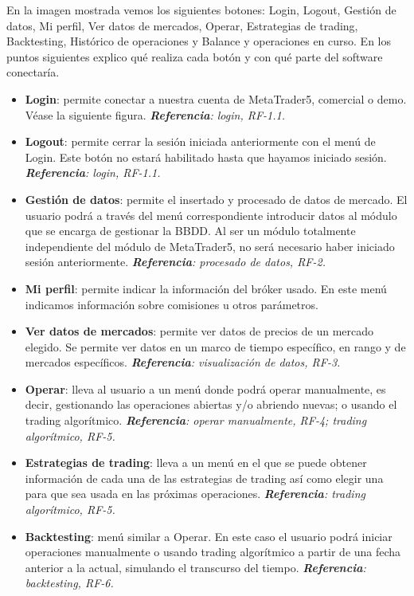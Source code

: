 \begin{titlepage}
En la imagen mostrada vemos los siguientes botones: Login, Logout, Gestión de datos, Mi perfil, Ver datos de mercados, Operar, Estrategias de trading, Backtesting, Histórico de operaciones y Balance y operaciones en curso. En los puntos siguientes explico qué realiza cada botón y con qué parte del software conectaría.\newline

\begin{itemize}
	\item \textbf{Login}: permite conectar a nuestra cuenta de MetaTrader5, comercial o demo. Véase la siguiente figura. \textit{\textbf{Referencia}: login, RF-1.1.}
	\item \textbf{Logout}: permite cerrar la sesión iniciada anteriormente con el menú de Login. Este botón no estará habilitado hasta que hayamos iniciado sesión. \textit{\textbf{Referencia}: login, RF-1.1.}
	\item \textbf{Gestión de datos}: permite el insertado y procesado de datos de mercado. El usuario podrá a través del menú correspondiente introducir datos al módulo que se encarga de gestionar la BBDD. Al ser un módulo totalmente independiente del módulo de MetaTrader5, no será necesario haber iniciado sesión anteriormente. \textit{\textbf{Referencia}: procesado de datos, RF-2.}
	\item \textbf{Mi perfil}: permite indicar la información del bróker usado. En este menú indicamos información sobre comisiones u otros parámetros.
	\item \textbf{Ver datos de mercados}: permite ver datos de precios de un mercado elegido. Se permite ver datos en un marco de tiempo específico, en rango y de mercados específicos. \textit{\textbf{Referencia}: visualización de datos, RF-3.}
	\item \textbf{Operar}: lleva al usuario a un menú donde podrá operar manualmente, es decir, gestionando las operaciones abiertas y/o abriendo nuevas; o usando el trading algorítmico. \textit{\textbf{Referencia}: operar manualmente, RF-4; trading algorítmico, RF-5.} 
	\item \textbf{Estrategias de trading}: lleva a un menú en el que se puede obtener información de cada una de las estrategias de trading así como elegir una para que sea usada en las próximas operaciones. \textit{\textbf{Referencia}: trading algorítmico, RF-5.} 
	\item \textbf{Backtesting}: menú similar a Operar. En este caso el usuario podrá iniciar operaciones manualmente o usando trading algorítmico a partir de una fecha anterior a la actual, simulando el transcurso del tiempo. \textit{\textbf{Referencia}: backtesting, RF-6.} 

\end{itemize}
\end{titlepage}
